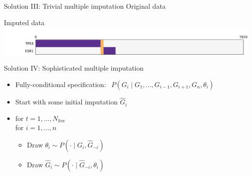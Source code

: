 \documentclass[mathserif]{beamer}
\begin{document}
\begin{frame}{Solution III: Trivial multiple imputation}
  \centering
  Original data
  
  \vspace{3em}
  Imputed data
  \includegraphics[width=\textwidth,trim={2cm 0 0 1cm},clip]{figures/group_filled.pdf}
\end{frame}

\begin{frame}{Solution IV: Sophisticated multiple imputation}
  \begin{itemize}
    \item Fully-conditional specification: $\ \ P(G_i \mid G_1, \ldots, G_{i-1}, G_{i+1}, G_n, \theta_i)$
    \vspace{1em}
    \item Start with some initial imputation $\hat{G}_i$
    \vspace{1em}
    \item for $t = 1,\ldots,N_{\textrm{iter}}$\\[0.2em]
          \hspace{0.9em}for $i = 1,\ldots, n$
    \vspace{0.5em}
    \begin{itemize}
    	\item Draw $\theta_i \sim P(\cdot \mid G_i, \hat{G}_{-i})$
    	\vspace{0.5em}
    	\item Draw $\hat{G}_i \sim P(\cdot \mid \hat{G}_{-i}, \theta_i)$
    \end{itemize}
  \end{itemize}
  \vspace{2em}
  
  
\end{frame}
\end{document}
